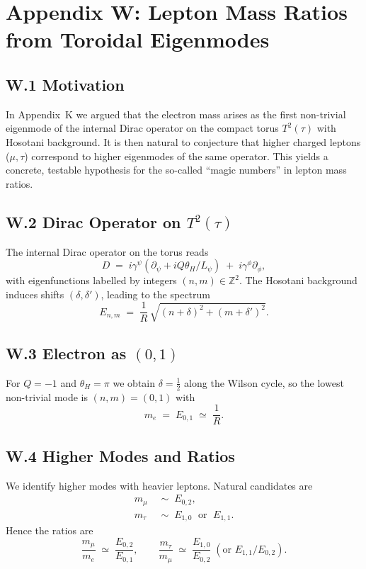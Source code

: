 
\appendix
\section*{Appendix W: Lepton Mass Ratios from Toroidal Eigenmodes}

\subsection*{W.1 Motivation}
In Appendix~K we argued that the electron mass arises as the first non-trivial eigenmode of the internal Dirac operator on the compact torus $T^2(\tau)$ with Hosotani background. 
It is then natural to conjecture that higher charged leptons ($\mu,\tau$) correspond to higher eigenmodes of the same operator. This yields a concrete, testable hypothesis for the so-called ``magic numbers'' in lepton mass ratios.

\subsection*{W.2 Dirac Operator on $T^2(\tau)$}
The internal Dirac operator on the torus reads
\begin{equation}
D \;=\; i\gamma^\psi \!\left(\partial_\psi + i Q \theta_H/L_\psi\right) \;+\; i\gamma^\phi \partial_\phi ,
\end{equation}
with eigenfunctions labelled by integers $(n,m)\in\mathbb{Z}^2$.
The Hosotani background induces shifts $(\delta,\delta')$, leading to the spectrum
\begin{equation}
E_{n,m} \;=\; \frac{1}{R}\,\sqrt{(n+\delta)^2+(m+\delta')^2}.
\end{equation}

\subsection*{W.3 Electron as $(0,1)$}
For $Q=-1$ and $\theta_H=\pi$ we obtain $\delta=\tfrac{1}{2}$ along the Wilson cycle, so the lowest non-trivial mode is $(n,m)=(0,1)$ with
\begin{equation}
m_e \;=\; E_{0,1} \;\simeq\; \frac{1}{R}.
\end{equation}

\subsection*{W.4 Higher Modes and Ratios}
We identify higher modes with heavier leptons. Natural candidates are
\begin{align}
m_\mu &\;\sim\; E_{0,2}, \\
m_\tau &\;\sim\; E_{1,0} \;\text{ or }\; E_{1,1}.
\end{align}
Hence the ratios are
\begin{equation}
\frac{m_\mu}{m_e} \;\simeq\; \frac{E_{0,2}}{E_{0,1}}, \qquad
\frac{m_\tau}{m_\mu} \;\simeq\; \frac{E_{1,0}}{E_{0,2}} \;(\text{or } E_{1,1}/E_{0,2}).
\end{equation}

